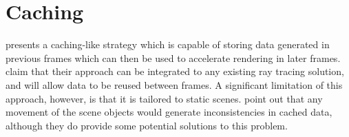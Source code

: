 \section{Caching}
\cite{ruff13dynamiccaching} presents a caching-like strategy which is capable of storing data generated in previous frames which can then be used to accelerate rendering in later frames. \citeauthor{ruff13dynamiccaching} claim that their approach can be integrated to any existing ray tracing solution, and will allow data to be reused between frames. A significant limitation of this approach, however, is that it is tailored to static scenes. \citeauthor{ruff13dynamiccaching} point out that any movement of the scene objects would generate inconsistencies in cached data, although they do provide some potential solutions to this problem.